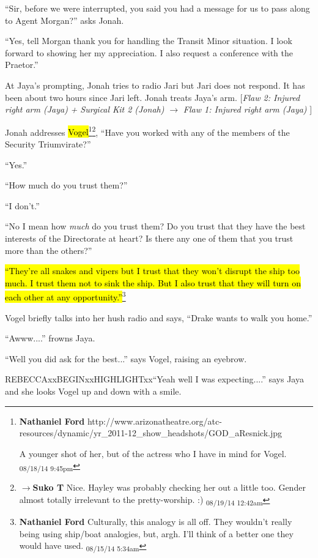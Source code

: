 ``Sir, before we were interrupted, you said you had a message for us to pass along to Agent Morgan?'' asks Jonah.

``Yes, tell Morgan thank you for handling the Transit Minor situation.  I look forward to showing her my appreciation.  I also request a conference with the Praetor.''



At Jaya's prompting, Jonah tries to radio Jari but Jari does not respond.  It has been about two hours since Jari left.  Jonah treats Jaya's arm. {[}\textit{Flaw 2: Injured right arm (Jaya)}\textit{ + Surgical Kit 2 (Jonah) $\rightarrow$ }\textit{ {\color[RGB]{255,0,0}Flaw 1: Injured right arm (Jaya)} }{]}



Jonah addresses \hl{Vogel}\footnote{\textbf{Nathaniel Ford }http://www.arizonatheatre.org/atc-resources/dynamic/yr\_2011-12\_show\_headshots/GOD\_aResnick.jpg

A younger shot of her, but of the actress who I have in mind for Vogel. \textsubscript{08/18/14 9:45pm}}\footnote{$\rightarrow$\textbf{Suko T }Nice.  Hayley was probably checking her out a little too.  Gender almost totally irrelevant to the pretty-worship. :) \textsubscript{08/19/14 12:42am}}, ``Have you worked with any of the members of the Security Triumvirate?''

``Yes.''

``How much do you trust them?''

``I don't.''

``No I mean how \textit{much} do you trust them?  Do you trust that they have the best interests of the Directorate at heart?  Is there any one of them that you trust more than the others?''

\hl{``They're all snakes and vipers but I trust that they won't disrupt the ship too much.  I trust them not to sink the ship.  But I also trust that they will turn on each other at any opportunity.''}\footnote{\textbf{Nathaniel Ford }Culturally, this analogy is all off. They wouldn't really being using ship/boat analogies, but, argh. I'll think of a better one they would have used. \textsubscript{08/15/14 5:34am}}

Vogel briefly talks into her hush radio and says, ``Drake wants to walk you home.''

``Awww....'' frowns Jaya.

``Well you did ask for the best...'' says Vogel, raising an eyebrow.

REBECCAxxBEGINxxHIGHLIGHTxx``Yeah well I was expecting....'' says Jaya and she looks Vogel up and down with a smile.

